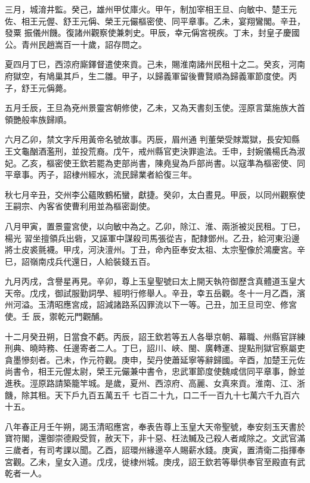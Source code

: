 \begin{pinyinscope}
 三月，城淯井監。癸己，雄州甲仗庫火。甲午，制加宰相王旦、向敏中、楚王元佐、相王元偓、舒王元偁、榮王元儼樞密使、同平章事。乙未，宴翔鸞閣。辛丑，發粟
 振儀州饑。復諸州觀察使兼刺史。甲辰，幸元偁宮視疾。丁未，封皇子慶國公。青州民趙嵩百一十歲，詔存問之。



 夏四月丁巳，西涼府廝鐸督遣使來貢。己未，賜淮南諸州民租十之二。癸亥，河南府獄空，有鳩巢其戶，生二雛。甲子，以歸義軍留後曹賢順為歸義軍節度使。丙子，舒王元偁薨。



 五月壬辰，王旦為兗州景靈宮朝修使，乙未，又為天書刻玉使。涇原言葉施族大首領艷般率族歸順。



 六月乙卯，禁文字斥用黃帝名號故事。丙辰，眉州通
 判董榮受賕鬻獄，長安知縣王文龜酗酒濫刑，並投荒裔。戊午，戒州縣官吏決罪逾法。壬申，封婉儀楊氏為淑妃。乙亥，樞密使王欽若罷為吏部尚書，陳堯叟為戶部尚書。以寇準為樞密使、同平章事。丙子，詔棣州經水，流民歸業者給復三年。



 秋七月辛丑，交州李公蘊敗鶴柘蠻，獻捷。癸卯，太白晝見。甲辰，以同州觀察使王嗣宗、內客省使曹利用並為樞密副使。



 八月甲寅，置景靈宮使，以向敏中為之。乙卯，除江、淮、兩浙被災民租。丁巳，楊光
 習坐擅領兵出砦，又誣軍中謀殺司馬張從吉，配隸鄧州。乙丑，給河東沿邊將士皮裘氈襪。甲戌，河決澶州。丁丑，命內臣奉安太祖、太宗聖像於鴻慶宮。辛巳，詔嶺南戍兵代還日，人給裝錢五百。



 九月丙戌，含譽星再見。辛卯，尊上玉皇聖號曰太上開天執符御歷含真體道玉皇大天帝。戊戌，御試服勤詞學、經明行修舉人。辛丑，幸五岳觀。冬十一月乙酉，濱州河溢。玉清昭應宮成，詔減諸路系囚罪流以下一等。己丑，加王旦司空、修宮使。壬
 辰，禦乾元門觀酺。



 十二月癸丑朔，日當食不虧。丙辰，詔王欽若等五人各舉京朝、幕職、州縣官詳練刑典、曉時務、任邊寄者二人。丁巳，詔川、峽、閩、廣轉運、提點刑獄官察屬吏貪墨慘刻者。己未，作元符觀。庚申，契丹使蕭延寧等辭歸國。辛酉，加楚王元佐尚書令，相王元偓太尉，榮王元儼兼中書令，忠武軍節度使魏咸信同平章事，餘並進秩。涇原路請築籠竿城。是歲，夏州、西涼府、高麗、女真來貢。淮南、江、浙饑，除其租。天下戶九百五萬五千
 七百二十九，口二千一百九十七萬六千九百六十五。



 八年春正月壬午朔，謁玉清昭應宮，奉表告尊上玉皇大天帝聖號，奉安刻玉天書於寶符閣，還御崇德殿受賀，赦天下，非十惡、枉法贓及己殺人者咸除之。文武官滿三歲者，有司考課以聞。乙酉，詔環州緣邊卒人賜薪水錢。庚寅，置清衛二指揮奉宮觀。乙未，皇女入道。戊戌，徙棣州城。庚戌，詔王欽若等舉供奉官至殿直有武乾者一人。




\end{pinyinscope}
